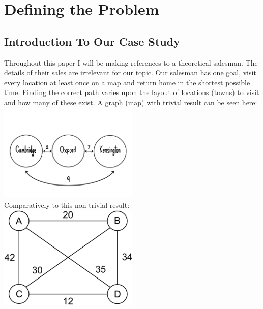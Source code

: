 \documentclass[12pt]{report}
\begin{document}
\chapter{Defining the Problem}
\section{Introduction To Our Case Study}
Throughout this paper I will be making references to a theoretical salesman.
The details of their sales are irrelevant for our topic.
Our salesman has one goal, visit every location at least once on a map and return home in the shortest possible time.
Finding the correct path varies upon the layout of locations (towns) to visit and how many of these exist.
A graph (map) with trivial result can be seen here:\\
\includegraphics[width=0.5\textwidth]{trivialTSP.png}\\
\vspace{0.5cm}
Comparatively to this non-trivial result:\\
\includegraphics[width=0.5\textwidth]{HarderTSP.png}
\end{document}
